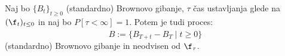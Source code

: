 \documentclass[11pt]{article}
\begin{document}
  

    \begin{Izrek}
    Naj bo $\{B_t\}_{t \geq 0}$ (standardno) Brownovo gibanje, $\tau$ čas ustavljanja glede na 
    $(\f_t)_{t \leq 0}$ in naj bo $P[\tau < \infty] = 1$. Potem je tudi proces:
    \[
    \hat{B} := \{B_{T+t} - B_T \mid t \geq 0\}
    \]
    (standardno) Brownovo gibanje in neodvisen od $\f_\tau$.
    \end{Izrek}
   
    
    
\end{document}
